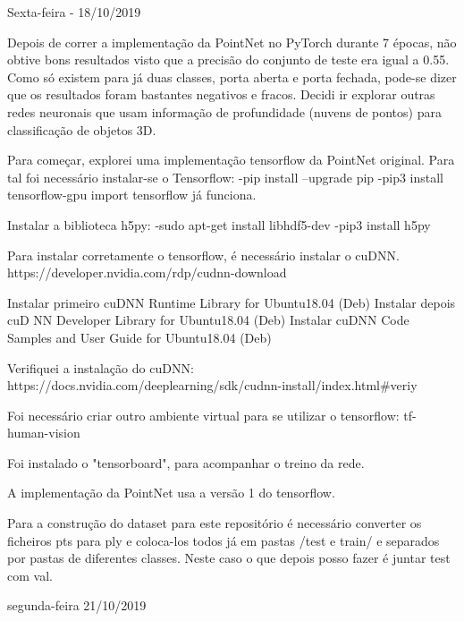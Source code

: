         
        Sexta-feira - 18/10/2019
        
        Depois de correr a implementação da PointNet no PyTorch durante 7 épocas, não obtive bons resultados visto que a precisão do conjunto de teste era igual a 0.55. Como só existem para já duas classes, porta aberta e porta fechada, pode-se dizer que os resultados foram bastantes negativos e fracos. Decidi ir explorar outras redes neuronais que usam informação de profundidade (nuvens de pontos) para classificação de objetos 3D.
        
        Para começar, explorei uma implementação tensorflow da PointNet original. Para tal foi necessário instalar-se o Tensorflow:
            -pip install --upgrade pip
            -pip3 install tensorflow-gpu
            import tensorflow já funciona.
        
        Instalar a biblioteca h5py:
            -sudo apt-get install libhdf5-dev
            -pip3 install h5py
            
        Para instalar corretamente o tensorflow, é necessário instalar o cuDNN.
        https://developer.nvidia.com/rdp/cudnn-download
        
        Instalar primeiro cuDNN Runtime Library for Ubuntu18.04 (Deb)
        Instalar depois cuD
        NN Developer Library for Ubuntu18.04 (Deb)
        Instalar cuDNN Code Samples and User Guide for Ubuntu18.04 (Deb)
        
        Verifiquei a instalação do cuDNN:
        https://docs.nvidia.com/deeplearning/sdk/cudnn-install/index.html\#veriy
        
        Foi necessário criar outro ambiente virtual para se utilizar o tensorflow: tf-human-vision
        
        Foi instalado o "tensorboard", para acompanhar o treino da rede.
        
        A implementação da PointNet usa a versão 1 do tensorflow.
        
        Para a construção do dataset para este repositório é necessário converter os ficheiros pts para ply e coloca-los todos já em pastas /test e train/ e separados por pastas de diferentes classes. Neste caso o que depois posso fazer é juntar test com val.





    segunda-feira 21/10/2019
        
    
    

